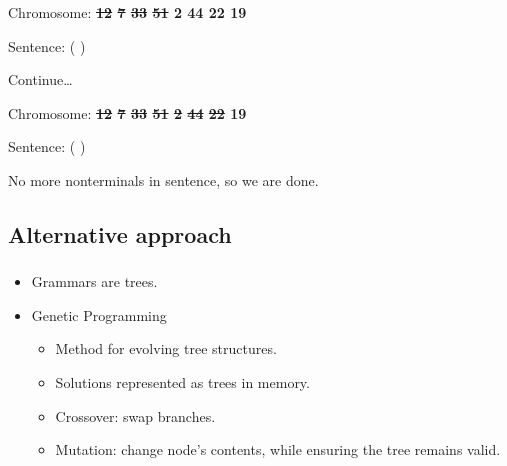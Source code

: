 \documentclass{beamer}
\makeatletter
\newcommand*{\currentname}{\@currentlabelname}
\makeatother
\begin{document}
\begin{frame}
\begin{itemize}
	{		
		\item Chromosome: \textbf{\sout{12} \sout{7} \sout{33} \sout{51} 2 44 22 19}
		\item Sentence:  \lit*{-} (  )
		\item Continue\ldots
	}

	{		
		\item Chromosome: \textbf{\sout{12} \sout{7} \sout{33} \sout{51} \sout{2} \sout{44} \sout{22} 19}
		\item Sentence:  \lit*{-} ( \lit*{+} )
		\item No more nonterminals in sentence, so we are done.
	}

\end{itemize}
\end{frame}

\subsection{Alternative approach}
\begin{frame}
\frametitle{\currentname}

\begin{itemize}
	\item Grammars are trees.
\end{itemize}

\begin{itemize}
	\item Genetic Programming
	\begin{itemize}
		\item Method for evolving tree structures.
		\item Solutions represented as trees in memory.
		\item Crossover: swap branches.
		\item Mutation: change node's contents, while ensuring the tree remains valid.
	\end{itemize}
\end{itemize}

\end{frame}
\end{document}
